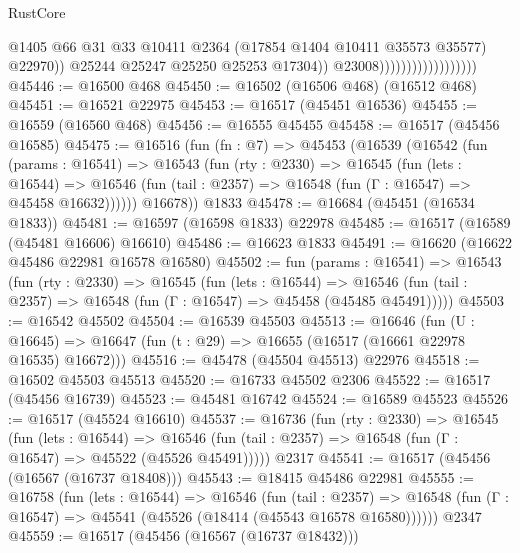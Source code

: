 \begin{lexlean}{RustCore}
\begin{coremodule}
                                                @1405
                                                @66
                                                @31
                                                @33
                                                @10411
                                                @2364
                                                (@17854 @1404 @10411 @35573 @35577)
                                                @22970))
                                            @25244
                                            @25247
                                            @25250
                                            @25253
                                            @17304))
                                        @23008))))))))))))))))))
@45446 := @16500 @468
@45450 := @16502 (@16506 @468) (@16512 @468)
@45451 := @16521 @22975
@45453 := @16517 (@45451 @16536)
@45455 := @16559 (@16560 @468)
@45456 := @16555 @45455
@45458 := @16517 (@45456 @16585)
@45475 := @16516
    (fun (fn : @7) =>
    @45453
      (@16539
        (@16542
          (fun (params : @16541) =>
          @16543
            (fun (rty : @2330) =>
            @16545
              (fun (lets : @16544) =>
              @16546 (fun (tail : @2357) => @16548 (fun (Γ : @16547) => @45458 @16632))))))
        @16678))
    @1833
@45478 := @16684 (@45451 (@16534 @1833))
@45481 := @16597 (@16598 @1833) @22978
@45485 := @16517 (@16589 (@45481 @16606) @16610)
@45486 := @16623 @1833
@45491 := @16620 (@16622 @45486 @22981 @16578 @16580)
@45502 := fun (params : @16541) =>
  @16543
    (fun (rty : @2330) =>
    @16545
      (fun (lets : @16544) =>
      @16546 (fun (tail : @2357) => @16548 (fun (Γ : @16547) => @45458 (@45485 @45491)))))
@45503 := @16542 @45502
@45504 := @16539 @45503
@45513 := @16646
    (fun (U : @16645) => @16647 (fun (t : @29) => @16655 (@16517 (@16661 @22978 @16535) @16672)))
@45516 := @45478 (@45504 @45513) @22976
@45518 := @16502 @45503 @45513
@45520 := @16733 @45502 @2306
@45522 := @16517 (@45456 @16739)
@45523 := @45481 @16742
@45524 := @16589 @45523
@45526 := @16517 (@45524 @16610)
@45537 := @16736
    (fun (rty : @2330) =>
    @16545
      (fun (lets : @16544) =>
      @16546 (fun (tail : @2357) => @16548 (fun (Γ : @16547) => @45522 (@45526 @45491)))))
    @2317
@45541 := @16517 (@45456 (@16567 (@16737 @18408)))
@45543 := @18415 @45486 @22981
@45555 := @16758
    (fun (lets : @16544) =>
    @16546
      (fun (tail : @2357) =>
      @16548 (fun (Γ : @16547) => @45541 (@45526 (@18414 (@45543 @16578 @16580))))))
    @2347
@45559 := @16517 (@45456 (@16567 (@16737 @18432)))

\end{coremodule}
\end{lexlean}
